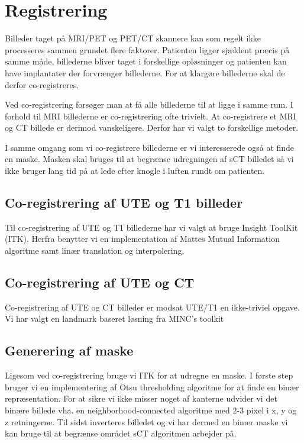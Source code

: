 \section{Registrering}

Billeder taget på MRI/PET og PET/CT skannere kan som regelt ikke processeres sammen
grundet flere faktorer. Patienten ligger sjældent præcis på samme måde, billederne
bliver taget i forskellige opløsninger og patienten kan have implantater der
forvrænger billederne. For at klargøre billederne skal de derfor co-registreres.

Ved co-registrering forsøger man at få alle billederne til at ligge i samme rum.
I forhold til MRI billederne er co-registrering ofte trivielt. At co-registrere
et MRI og CT billede er derimod vanskeligere. Derfor har vi valgt to forskellige
metoder.

I samme omgang som vi co-registrere billederne er vi interesserede også at finde
en maske. Masken skal bruges til at begrænse udregningen af sCT billedet så vi
ikke bruger lang tid på at lede efter knogle i luften rundt om patienten.

\subsection{Co-registrering af UTE og T1 billeder}

Til co-registrering af UTE og T1 billederne har vi valgt at bruge Insight ToolKit
(ITK). Herfra benytter vi en implementation af Mattes Mutual Information algoritme
samt linær translation og interpolering.

\subsection{Co-registrering af UTE og CT}

Co-registrering af UTE og CT billeder er modsat UTE/T1 en ikke-triviel opgave. Vi
har valgt en landmark baseret løsning fra MINC's toolkit

\subsection{Generering af maske}

Ligesom ved co-registrering bruge vi ITK for at udregne en maske. I første step
bruger vi en implementering af Otsu thresholding algoritme for at finde en binær
repræsentation. For at sikre vi ikke misser noget af kanterne udvider vi det 
binære billede vha. en neighborhood-connected algoritme med 2-3 pixel i x, y og z
retningerne. Til sidst inverteres billedet og vi har dermed en binær maske vi kan
bruge til at begrænse området sCT algoritmen arbejder på.